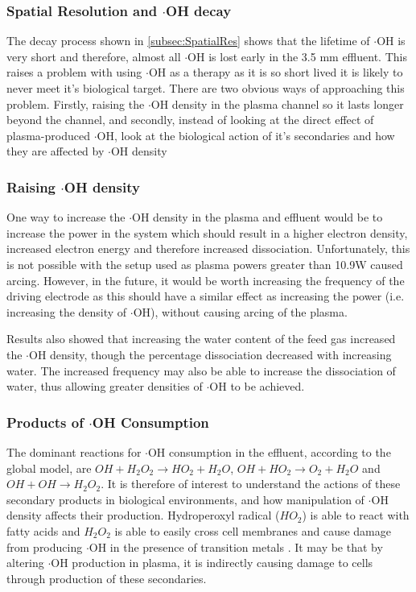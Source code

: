 \documentclass[11pt, oneside]{article}   	%
\begin{document}
\subsubsection{Spatial Resolution and $\cdot$OH decay} 
The decay process shown in \ref{subsec:SpatialRes} shows that the lifetime of $\cdot$OH is very short and therefore, almost all $\cdot$OH is lost early in the 3.5 mm effluent. 
This raises a problem with using $\cdot$OH as a therapy as it is so short lived it is likely to never meet it's biological target.
There are two obvious ways of approaching this problem. Firstly, raising the $\cdot$OH density in the plasma channel so it lasts longer beyond the channel, and secondly, instead of looking at the direct effect of plasma-produced $\cdot$OH, look at the biological action of it's secondaries and how they are affected by $\cdot$OH density

\subsubsection{Raising $\cdot$OH density}

One way to increase the $\cdot$OH density in the plasma and effluent would be to increase the power in the system which should result in a higher electron density, increased electron energy and therefore increased dissociation.
Unfortunately, this is not possible with the setup used as plasma powers greater than 10.9W caused arcing.
However, in the future, it would be worth increasing the frequency of the driving electrode as this should have a similar effect as increasing the power (i.e. increasing the density of $\cdot$OH), without causing arcing of the plasma.

Results also showed that increasing the water content of the feed gas increased the $\cdot$OH density, though the percentage dissociation decreased with increasing water. 
The increased frequency may also be able to increase the dissociation of water, thus allowing greater densities of $\cdot$OH to be achieved.
 

\subsubsection{Products of $\cdot$OH Consumption}

The dominant reactions for $\cdot$OH consumption in the effluent, according to the global model, are $ OH + H_2O_2 \rightarrow HO_2 + H_2O$, $OH + HO_2 \rightarrow O_2 + H_2O$ and $OH + OH \rightarrow H_2O_2$.
It is therefore of interest to understand the actions of these secondary products in biological environments, and how manipulation of $\cdot$OH density affects their production. 
Hydroperoxyl radical ($HO_2$) is able to react with fatty acids and $H_2O_2$ is able to easily cross cell membranes and cause damage from producing $\cdot$OH in the presence of transition metals \cite{Phaniendra2015}.
It may be that by altering $\cdot$OH production in plasma, it is indirectly causing damage to cells through production of these secondaries.
\end{document}
